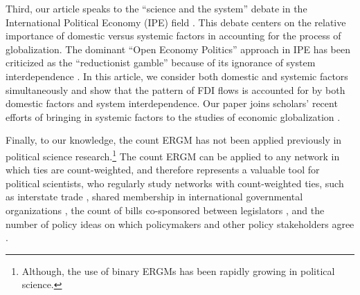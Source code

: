 \documentclass[reqno,onecolumn,letterpaper,12pt]{article}
\begin{document}
Third, our article speaks to the ``science and the system'' debate in the International Political Economy (IPE) field \citep[see,][]{Chaudoin_Milner:2017,Oatley:2011,Chaudoin_et_al:2014,Cohen:2008,Drezner_McNamara:2013}. This debate centers on the relative importance of domestic versus systemic factors in accounting for the process of globalization. The dominant ``Open Economy Politics'' approach \citep{Lake:2009} in IPE has been criticized as the ``reductionist gamble'' because of its ignorance of system interdependence \citep{Oatley:2011}. In this article, we consider both domestic and systemic factors simultaneously and show that the pattern of FDI flows is accounted for by both domestic factors and system interdependence. Our paper joins scholars' recent efforts of bringing in systemic factors to the studies of economic globalization \cite[see,~e.g.,][]{Chaudoin_et_al:2014,ward2013gravity,cao2014democracies,Chaudoin_Wilf:2018,Hafner-Burton:2009}.

Finally, to our knowledge, the count ERGM has not been applied previously in political science research.\footnote{Although, the use of binary ERGMs has been rapidly growing in political science.} The count ERGM can be applied to any network in which ties are count-weighted, and therefore represents a valuable tool for political scientists, who regularly study networks with count-weighted ties, such as interstate trade \citep{ward2007persistent}, shared membership in international governmental organizations \citep{boehmke2016addressing}, the count of bills co-sponsored between legislators \citep{kirkland2013hypothesis}, and the number of policy ideas on which policymakers and other policy stakeholders agree \citep{leifeld2013reconceptualizing}.



\end{document}
